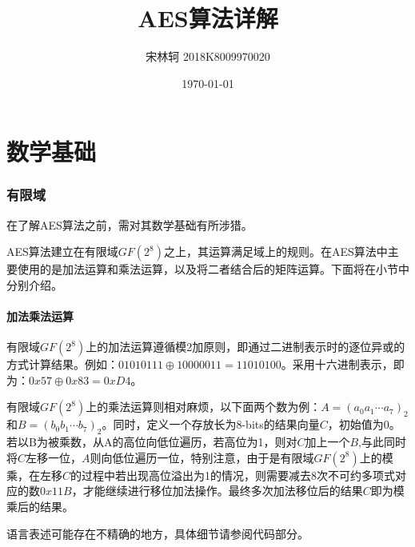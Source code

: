 \documentclass[UTF8]{ctexart}
\title{\Huge AES算法详解}
\author{\large 宋林轲 2018K8009970020}
\date{\large \today}
\begin{document}
\maketitle


\tableofcontents

\part{数学基础}
\section{有限域}
在了解AES算法之前，需对其数学基础有所涉猎。

AES算法建立在有限域$GF(2^8)$之上，其运算满足域上的规则。在AES算法中主要使用的是加法运算和乘法运算，以及将二者结合后的矩阵运算。下面将在小节中分别介绍。
\subsection{加法乘法运算}
有限域$GF(2^8)$上的加法运算遵循模2加原则，即通过二进制表示时的逐位异或的方式计算结果。例如：$01010111 \oplus 10000011 = 11010100$。采用十六进制表示，即为：$0x57 \oplus 0x83 = 0xD4$。

有限域$GF(2^8)$上的乘法运算则相对麻烦，以下面两个数为例：$A=(a_{0}a_{1} \cdots a_{7})_{2}$和$B=(b_{0}b_{1} \cdots b_{7})_{2}$。同时，定义一个存放长为8-bits的结果向量$C$，初始值为$0$。若以B为被乘数，从A的高位向低位遍历，若高位为1，则对$C$加上一个$B$,与此同时将$C$左移一位，$A$则向低位遍历一位，特别注意，由于是有限域$GF(2^8)$上的模乘，在左移$C$的过程中若出现高位溢出为1的情况，则需要减去8次不可约多项式对应的数$0x11B$，才能继续进行移位加法操作。最终多次加法移位后的结果$C$即为模乘后的结果。

语言表述可能存在不精确的地方，具体细节请参阅代码部分。
\end{document}
